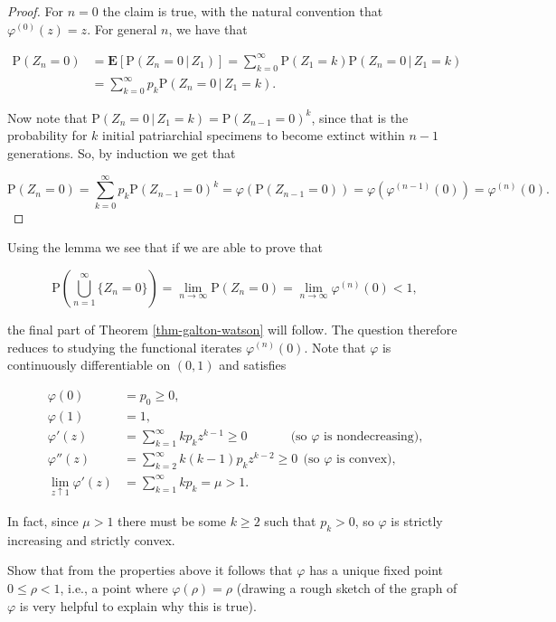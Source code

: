 \begin{proof}
For $n=0$ the claim is true, with the natural
convention that $\varphi^{(0)}(z)=z$. For general $n$,
we have that

\begin{align*}
\mathrm{P}(Z_n = 0) &= \mathbf{E}\left[ \mathrm{P}\left( Z_n=0\,|\,Z_1 \right) \right] = \sum_{k=0}^\infty \mathrm{P}(Z_1=k) \mathrm{P}\left(Z_n=0\,|\,Z_1=k\right) \\
&= \sum_{k=0}^\infty p_k \mathrm{P}\left(Z_n=0\,|\,Z_1=k\right).
\end{align*}

\noindent Now note that
$\mathrm{P}\left(Z_n=0\,|\,Z_1=k\right)=\mathrm{P}(Z_{n-1}=0)^k$,
since that is the probability for $k$ initial
patriarchial specimens to become extinct within $n-1$
generations. So, by induction we get that

\[
\mathrm{P}(Z_n=0) = \sum_{k=0}^\infty p_k \mathrm{P}(Z_{n-1}=0)^k = \varphi(\mathrm{P}(Z_{n-1}=0)) = \varphi(\varphi^{(n-1)}(0))
= \varphi^{(n)}(0).
\]

\end{proof}

\noindent Using the lemma we see that if we are able to prove
that

\[
\mathrm{P}\left(\bigcup_{n=1}^\infty \{Z_n=0\}\right)= \lim_{n\to\infty} \mathrm{P}(Z_n=0) = \lim_{n\to\infty} \varphi^{(n)}(0)<1,
\]

\noindent the final part of Theorem \ref{thm-galton-watson} will
follow. The question therefore reduces to studying the
functional iterates $\varphi^{(n)}(0)$. Note that
$\varphi$ is continuously differentiable on $(0,1)$
and satisfies

\begin{align*}
\varphi(0) &= p_0 \ge 0, \\
\varphi(1) &=1, \\
\varphi'(z) &= \sum_{k=1}^\infty k p_k z^{k-1} \ge 0 \qquad\quad\  \ \textrm{(so $\varphi$ is nondecreasing),}\\
\varphi''(z) &= \sum_{k=2}^\infty k(k-1) p_k z^{k-2} \ge 0 \ \ \textrm{(so $\varphi$ is convex)}, \\
\lim_{z\uparrow 1} \varphi'(z) &= \sum_{k=1}^\infty k p_k = \mu > 1.
\end{align*}

\noindent In fact, since $\mu>1$ there must be some $k\ge 2$
such that $p_k>0$, so $\varphi$ is strictly
increasing and strictly convex.

\begin{xexercise}
Show that from the properties above it follows that
$\varphi$ has a unique fixed point $0\le \rho<1$,
i.e., a point where $\varphi(\rho)=\rho$ (drawing a
rough sketch of the graph of $\varphi$ is very
helpful to explain why this is true).
\end{xexercise}

